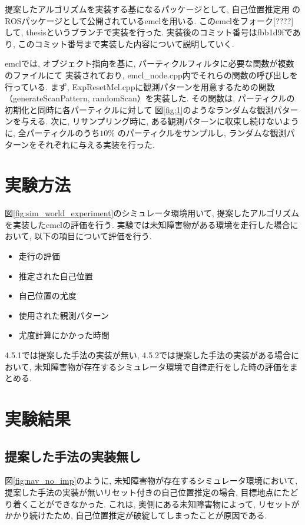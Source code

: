 提案したアルゴリズムを実装する基になるパッケージとして, 自己位置推定用
のROSパッケージとして公開されているemclを用いる. 
このemclをフォーク[????]して, thesisというブランチで実装を行った. 
実装後のコミット番号はfbb1d9fであり, このコミット番号まで実装した内容について説明していく. 

emclでは, オブジェクト指向を基に, パーティクルフィルタに必要な関数が複数のファイルにて
実装されており, emcl\_node.cpp内でそれらの関数の呼び出しを行っている. 
まず, ExpResetMcl.cppに観測パターンを用意するための関数（generateScanPattern, randomScan）を実装した. 
その関数は, パーティクルの初期化と同時に各パーティクルに対して
図\ref{fig:1}のようなランダムな観測パターンを与える. 
次に, リサンプリング時に, ある観測パターンに収束し続けないように, 全パーティクルのうち$10\%$
のパーティクルをサンプルし, ランダムな観測パターンをそれぞれに与える実装を行った. 

\section{実験方法}

図\ref{fig:sim_world_experiment}のシミュレータ環境用いて, 提案したアルゴリズムを実装したemclの評価を行う. 
実験では未知障害物がある環境を走行した場合において, 以下の項目について評価を行う. 
\begin{itemize}
  \item 走行の評価
  \item 推定された自己位置
  \item 自己位置の尤度
  \item 使用された観測パターン
  \item 尤度計算にかかった時間
\end{itemize}
4.5.1では提案した手法の実装が無い, 4.5.2では提案した手法の実装がある場合において, 
未知障害物が存在するシミュレータ環境で自律走行をした時の評価をまとめる. 

\newpage

\section{実験結果}

\subsection{提案した手法の実装無し}

図\ref{fig:nav_no_imp}のように, 未知障害物が存在するシミュレータ環境において, 提案した手法の実装が無いリセット付きの自己位置推定の場合, 
目標地点にたどり着くことができなかった. これは, 奥側にある未知障害物によって, リセットがかかり続けたため, 
自己位置推定が破綻してしまったことが原因である. 

